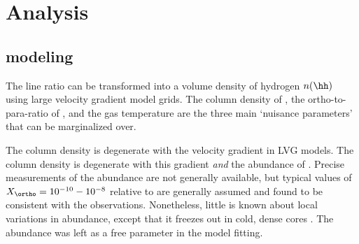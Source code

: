 \section{Analysis}
\label{sec:analysis}

\subsection{\formaldehyde modeling}
\label{sec:models}
The \formaldehyde line ratio can be transformed into a volume
density of hydrogen $n(\hh)$ using large velocity gradient model grids.
The column density of \ortho, the ortho-to-para-ratio of \hh, and the gas
temperature are the three main `nuisance parameters' that can be marginalized
over.

The \ortho column density is degenerate with the velocity gradient in LVG
models.  The \hh column density is degenerate with this gradient \emph{and} the
abundance of \ortho.  Precise measurements of the \formaldehyde abundance are
not generally available, but typical values of $X_{\ortho} = 10^{-10}-10^{-8}$
relative to \hh are generally assumed \citep{Mangum1993a, Ginsburg2011a,
Ginsburg2013a, Ao2013a} and found to be consistent with the observations.
Nonetheless, little is known about local variations in \ortho abundance, except
that it freezes out in cold, dense cores \citep{Young2004a}.
The abundance was left as a free parameter in the model fitting.


